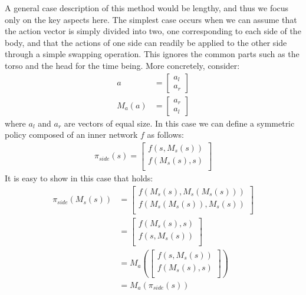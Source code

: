 A general case description of this method would be lengthy, and thus we focus only on the key aspects here. 
The simplest case occurs when we can assume that the action vector is simply divided 
into two, one corresponding to each side of the body, 
and that the actions of one side can readily be applied to the other side through a simple swapping operation.
This ignores the common parts such as the torso and the head for the time being.
More concretely, consider:
\begin{align*}
    a &= \begin{bmatrix}a_l\\a_r\end{bmatrix} \\
    M_a(a) &= \begin{bmatrix}a_r\\a_l\end{bmatrix}
\end{align*}
where $a_l$ and $a_r$ are vectors of equal size.
In this case we can define a symmetric policy composed of an inner network $f$ as follows:
\begin{align*}
    \pi_{side}(s) = \begin{bmatrix}
    f(s,M_s(s))\\
    f(M_s(s),s)\\
    \end{bmatrix}
\end{align*}
It is easy to show in this case that  holds:
\begin{align*}
    \pi_{side}(M_s(s)) &= \begin{bmatrix}
    f(M_s(s),M_s(M_s(s)))\\
    f(M_s(M_s(s)),M_s(s))\\
    \end{bmatrix}\\
    &= \begin{bmatrix}
    f(M_s(s),s)\\
    f(s,M_s(s))\\
    \end{bmatrix}\\
    &= M_a\left( \begin{bmatrix}
    f(s,M_s(s))\\
    f(M_s(s),s)\\
    \end{bmatrix} \right)\\
    &= M_a\left(\pi_{side}(s)\right)
\end{align*}

